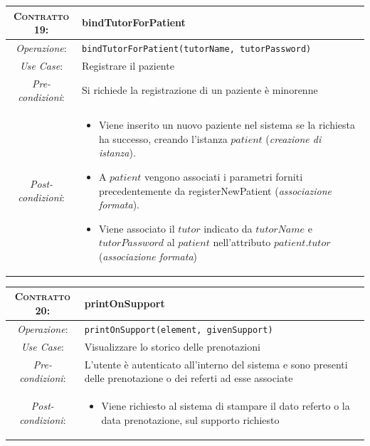 \begin{tabularx}{\columnwidth}{cX}
\toprule
\textsc{Contratto 19}:& \textbf{bindTutorForPatient}\\
\midrule
\textit{Operazione}: & 	\texttt{bindTutorForPatient(tutorName, tutorPassword)}\\
\textit{Use Case}: &	Registrare il paziente\\
\textit{Pre-condizioni}: &  Si richiede la registrazione di un paziente è minorenne\\
\textit{Post-condizioni}: & \begin{itemize}
\item Viene inserito un nuovo paziente nel sistema se la richiesta ha successo, 
	creando l'istanza $patient$ (\textit{creazione di istanza}).
\item A $patient$ vengono associati i parametri forniti precedentemente da
	registerNewPatient (\textit{associazione formata}).
\item Viene associato il $tutor$ indicato da $tutorName$ e $tutorPassword$ 
	al $patient$ nell'attributo $patient.tutor$ (\textit{associazione formata})
\end{itemize}\\
\bottomrule
\end{tabularx}
\medskip

\begin{tabularx}{\columnwidth}{cX}
\toprule
\textsc{Contratto 20}:& \textbf{printOnSupport}\\
\midrule
\textit{Operazione}: & 	\texttt{printOnSupport(element, givenSupport)}\\
\textit{Use Case}: &	Visualizzare lo storico delle prenotazioni\\
\textit{Pre-condizioni}: &  L'utente è autenticato all'interno del sistema e sono 
			presenti delle prenotazione o dei referti ad esse
			associate\\
\textit{Post-condizioni}: & \begin{itemize}
\item Viene richiesto al sistema di stampare il dato referto o la data 
	prenotazione, sul supporto richiesto
\end{itemize}\\
\bottomrule
\end{tabularx}
\medskip


